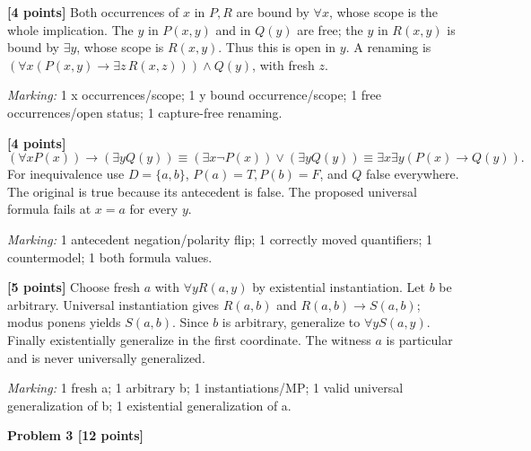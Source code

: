 \documentclass[12pt,letterpaper]{article}
\newcommand{\problemheading}[2][5\baselineskip]{\Needspace{#1}\par\noindent\hspace*{-0.625in}\textbf{#2}\par\nobreak\vspace{0.3em}}
\begin{document}
\begin{description}[font=\normalfont,leftmargin=1.2em,labelsep=0.4em]
\item[(a)] \textbf{[4 points]} Both occurrences of $x$ in $P,R$ are bound by $\forall x$, whose scope is the whole implication. The $y$ in $P(x,y)$ and in $Q(y)$ are free; the $y$ in $R(x,y)$ is bound by $\exists y$, whose scope is $R(x,y)$. Thus this is open in $y$. A renaming is $(\forall x(P(x,y)\to\exists z\,R(x,z)))\land Q(y)$, with fresh $z$.
\par\textit{Marking:} 1 x occurrences/scope; 1 y bound occurrence/scope; 1 free occurrences/open status; 1 capture-free renaming.
\item[(b)] \textbf{[4 points]} \[(\forall xP(x))\to(\exists yQ(y))\equiv(\exists x\neg P(x))\lor(\exists yQ(y))\equiv\exists x\exists y(P(x)\to Q(y)).\] For inequivalence use $D=\{a,b\}$, $P(a)=T,P(b)=F$, and $Q$ false everywhere. The original is true because its antecedent is false. The proposed universal formula fails at $x=a$ for every $y$.
\par\textit{Marking:} 1 antecedent negation/polarity flip; 1 correctly moved quantifiers; 1 countermodel; 1 both formula values.
\item[(c)] \textbf{[5 points]} Choose fresh $a$ with $\forall yR(a,y)$ by existential instantiation. Let $b$ be arbitrary. Universal instantiation gives $R(a,b)$ and $R(a,b)\to S(a,b)$; modus ponens yields $S(a,b)$. Since $b$ is arbitrary, generalize to $\forall yS(a,y)$. Finally existentially generalize in the first coordinate. The witness $a$ is particular and is never universally generalized.
\par\textit{Marking:} 1 fresh a; 1 arbitrary b; 1 instantiations/MP; 1 valid universal generalization of b; 1 existential generalization of a.
\end{description}
\vspace{0.65em}
\problemheading[\dimexpr 3\baselineskip+4\baselineskip\relax]{Problem 3 [12 points]}
\end{document}
